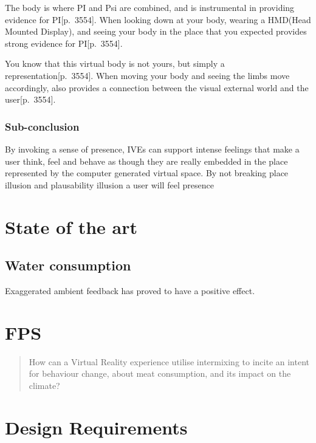     The body is where PI and Psi are combined, and is instrumental in providing evidence for PI\citep{vrImmersion}[p.~3554]. When looking down at your body, wearing a HMD(Head Mounted Display), and seeing your body in the place that you expected provides strong evidence for PI\citep{vrImmersion}[p.~3554].
    
    You know that this virtual body is not yours, but simply a representation\citep{vrImmersion}[p.~3554]. When moving your body and seeing the limbs move accordingly, also provides a connection between the visual external world and the user\citep{vrImmersion}[p.~3554].
    
    \subsubsection{Sub-conclusion}
    By invoking a sense of presence, IVEs can support intense feelings that make a user think, feel and behave as though they are really embedded in the place represented by the computer generated virtual space.
    By not breaking place illusion and plausability illusion a user will feel presence
    
    
\section{State of the art}
    \subsection{Water consumption}
    Exaggerated ambient feedback has proved to have a positive effect.\cite{waterConsumption}


\section{FPS}\label{sec:FPS}
\begin{quote}
    How can a Virtual Reality experience utilise intermixing to incite an intent for behaviour change, about meat consumption, and its impact on the climate?
\end{quote}

\section{Design Requirements}\label{designReq}

